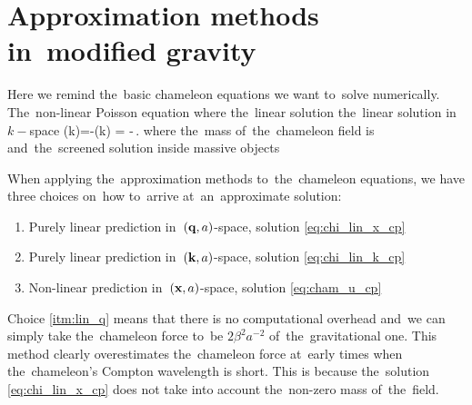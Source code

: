 \section{Approximation methods in~modified gravity}
Here we remind the~basic chameleon equations we want to~solve numerically. The~non-linear Poisson equation
where
the~linear solution
the~linear solution in~$k-$space
\eq
{
\label{eq:chi_lin_k_cp}
	\hat{\chi}(k)=-\hat{\delta}(k) = -\,.
}
where the~mass of~the~chameleon field is
and~the~screened solution inside massive objects

When applying the~approximation methods to~the~chameleon equations, we have three choices on~how to~arrive at~an~approximate solution:
\begin{enumerate}
\item \label{itm:lin_q} Purely linear prediction in~$(\mathbf q, a)$-space, solution \eqref{eq:chi_lin_x_cp}

\item \label{itm:lin_k} Purely linear prediction in~$(\mathbf k, a)$-space, solution \eqref{eq:chi_lin_k_cp}

\item \label{itm:nl_x} Non-linear prediction in~$(\mathbf x, a)$-space, solution \eqref{eq:cham_u_cp}
\end{enumerate}

Choice \ref{itm:lin_q} means that there is no computational overhead and~we can simply take the~chameleon force to~be $2\beta^2a^{-2}$ of~the~gravitational one. This method clearly overestimates the~chameleon force at~early times when the~chameleon's Compton wavelength is short. This is because the~solution \eqref{eq:chi_lin_x_cp} does not take into account the~non-zero mass of~the~field.

